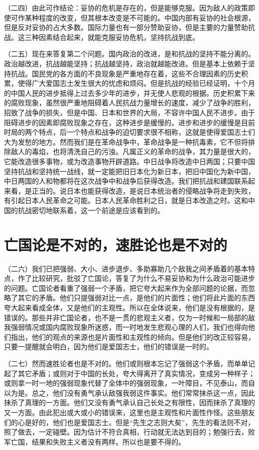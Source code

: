 （二四）由此可作结论：妥协的危机是存在的，但是能够克服。因为敌人的政策即使可作某种程度的改变，但其根本改变是不可能的。中国内部有妥协的社会根源，但是反对妥协的占大多数。国际力量也有一部分赞助妥协，但是主要的力量赞助抗战。这三种因素结合起来，就能克服妥协危机，坚持抗战到底。

（二五）现在来答复第二个问题。国内政治的改进，是和抗战的坚持不能分离的。政治越改进，抗战越能坚持；抗战越坚持，政治就越能改进。但是基本上依赖于坚持抗战。国民党的各方面的不良现象是严重地存在着，这些不合理因素的历史积累，使得广大爱国志士发生很大的忧虑和烦闷。但是抗战的经验已经证明，十个月的中国人民的进步抵得上过去多少年的进步，并无使人悲观的根据。历史积累下来的腐败现象，虽然很严重地阻碍着人民抗战力量增长的速度，减少了战争的胜利，招致了战争的损失，但是中国、日本和世界的大局，不容许中国人民不进步。由于阻碍进步的因素即腐败现象之存在，这种进步是缓慢的。进步和进步的缓慢是目前时局的两个特点，后一个特点和战争的迫切要求很不相称，这就是使得爱国志士们大为发愁的地方。然而我们是在革命战争中，革命战争是一种抗毒素，它不但将排除敌人的毒焰，也将清洗自己的污浊。凡属正义的革命的战争，其力量是很大的，它能改造很多事物，或为改造事物开辟道路。中日战争将改造中日两国；只要中国坚持抗战和坚持统一战线，就一定能把旧日本化为新日本，把旧中国化为新中国，中日两国的人和物都将在这次战争中和战争后获得改造。我们把抗战和建国联系起来看，是正当的。说日本也能获得改造，是说日本统治者的侵略战争将走到失败，有引起日本人民革命之可能。日本人民革命胜利之日，就是日本改造之时。这和中国的抗战密切地联系着，这一个前途是应该看到的。

\section{亡国论是不对的，速胜论也是不对的}

（二六）我们已把强弱、大小、进步退步、多助寡助几个敌我之间矛盾着的基本特点，作了比较研究，批驳了亡国论，答复了为什么不易妥协和为什么政治可能进步的问题。亡国论者看重了强弱一个矛盾，把它夸大起来作为全部问题的论据，而忽略了其它的矛盾。他们只提强弱对比一点，是他们的片面性；他们将此片面的东西夸大起来看成全体，又是他们的主观性。所以在全体说来，他们是没有根据的，是错误的。那些并非亡国论者，也不是一贯的悲观主义者，仅为一时候和一局部的敌我强弱情况或国内腐败现象所迷惑，而一时地发生悲观心理的人们，我们也得向他们指出，他们的观点的来源也是片面性和主观性的倾向。但是他们的改正较容易，只要一提醒就会明白，因为他们是爱国志士，他们的错误是一时的。

（二七）然而速胜论者也是不对的。他们或则根本忘记了强弱这个矛盾，而单单记起了其它矛盾；或则对于中国的长处，夸大得离开了真实情况，变成另一种样子；或则拿一时一地的强弱现象代替了全体中的强弱现象，一叶障目，不见泰山，而自以为是。总之，他们没有勇气承认敌强我弱这件事实。他们常常抹杀这一点，因此抹杀了真理的一方面。他们又没有勇气承认自己长处之有限性，因而抹杀了真理的又一方面。由此犯出或大或小的错误来，这里也是主观性和片面性作怪。这些朋友们的心是好的，他们也是爱国志士。但是“先生之志则大矣”，先生的看法则不对，照了做去，一定碰壁。因为估计不符合真相，行动就无法达到目的；勉强行去，败军亡国，结果和失败主义者没有两样。所以也是要不得的。

